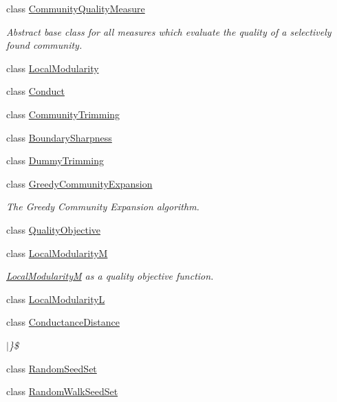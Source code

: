 \begin{DoxyCompactItemize}
class \hyperlink{class_networ_kit_1_1_community_quality_measure}{Community\-Quality\-Measure}
\begin{DoxyCompactList}\small\item\em Abstract base class for all measures which evaluate the quality of a selectively found community. \end{DoxyCompactList}\item 
class \hyperlink{class_networ_kit_1_1_local_modularity}{Local\-Modularity}
\item 
class \hyperlink{class_networ_kit_1_1_conduct}{Conduct}
\item 
class \hyperlink{class_networ_kit_1_1_community_trimming}{Community\-Trimming}
\item 
class \hyperlink{class_networ_kit_1_1_boundary_sharpness}{Boundary\-Sharpness}
\item 
class \hyperlink{class_networ_kit_1_1_dummy_trimming}{Dummy\-Trimming}
\item 
class \hyperlink{class_networ_kit_1_1_greedy_community_expansion}{Greedy\-Community\-Expansion}
\begin{DoxyCompactList}\small\item\em The Greedy Community Expansion algorithm. \end{DoxyCompactList}\item 
class \hyperlink{class_networ_kit_1_1_quality_objective}{Quality\-Objective}
\item 
class \hyperlink{class_networ_kit_1_1_local_modularity_m}{Local\-Modularity\-M}
\begin{DoxyCompactList}\small\item\em \hyperlink{class_networ_kit_1_1_local_modularity_m}{Local\-Modularity\-M} as a quality objective function. \end{DoxyCompactList}\item 
class \hyperlink{class_networ_kit_1_1_local_modularity_l}{Local\-Modularity\-L}
\item 
class \hyperlink{class_networ_kit_1_1_conductance_distance}{Conductance\-Distance}
\begin{DoxyCompactList}\small\item\em $|$\}\$ \end{DoxyCompactList}\item 
class \hyperlink{class_networ_kit_1_1_random_seed_set}{Random\-Seed\-Set}
\item 
class \hyperlink{class_networ_kit_1_1_random_walk_seed_set}{Random\-Walk\-Seed\-Set}
\item 

\end{DoxyCompactItemize}
